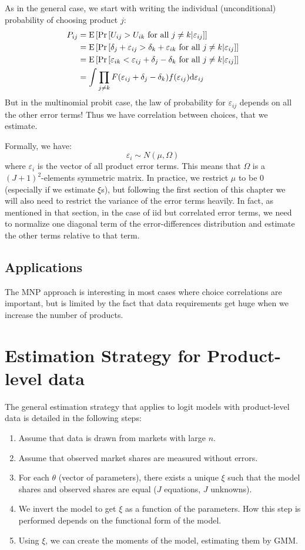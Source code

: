As in the general case, we start with writing the individual (unconditional) probability of choosing product $j$: \begin{align*} P_{ij} & = \operatorname{E}\left[\operatorname{Pr}\left[U_{ij}>U_{ik}\text{ for all } j\neq k | \varepsilon_{ij} \right]\right] \\ & = \operatorname{E}\left[\operatorname{Pr}\left[\delta_j + \varepsilon_{ij} >\delta_k + \varepsilon_{ik}\text{ for all } j\neq k| \varepsilon_{ij}\right]\right] \\
& =\operatorname{E}\left[ \operatorname{Pr}\left[ \varepsilon_{ik} < \varepsilon_{ij} + \delta_j - \delta_k \text{ for all } j\neq k| \varepsilon_{ij} \right]\right] \\
& = \int \prod_{j\neq k} F(\varepsilon_{ij} + \delta_j - \delta_k) f(\varepsilon_{ij})\mathrm{d} \varepsilon_{ij}
\end{align*}
But in the multinomial probit case, the law of probability for $\varepsilon_{ij}$ depends on all the other error terms! Thus we have correlation between choices, that we estimate.

Formally, we have: $$ \varepsilon_i \sim N(\mu, \Omega) $$ where $\varepsilon_i$ is the vector of all product error terms. This means that $\Omega$ is a $(J+1)^2$-elements symmetric matrix. In practice, we restrict $\mu$ to be 0 (especially if we estimate $\xi$s), but following the first section of this chapter we will also need to restrict the variance of the error terms heavily. In fact, as mentioned in that section, in the case of iid but correlated error terms, we need to normalize one diagonal term of the error-differences distribution and estimate the other terms relative to that term.

\subsection{Applications}

The MNP approach is interesting in most cases where choice correlations are important, but is limited by the fact that data requirements get huge when we increase the number of products.

\section{Estimation Strategy for Product-level data}

The general estimation strategy that applies to logit models with product-level data is detailed in the following steps:\begin{enumerate}
\item Assume that data is drawn from markets with large $n$.
\item Assume that observed market shares are measured without errors.
\item For each $\theta$ (vector of parameters), there exists a unique $\xi$ such that the model shares and observed shares are equal ($J$ equations, $J$ unknowns).
\item We invert the model to get $\xi$ as a function of the parameters. How this step is performed depends on the functional form of the model.
\item Using $\xi$, we can create the moments of the model, estimating them by GMM. 
\end{enumerate}

